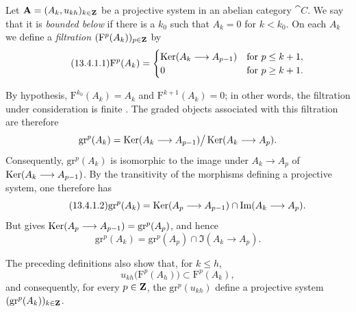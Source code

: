 \begin{env}[13.4.1]
\label{0.13.4.1}
Let
$\mathbf{A}=(A_k,u_{kh})_{k\in\mathbf{Z}}$ be a projective system in an
abelian category $\cat{C}$.
We say that it is \emph{bounded below} if there is a $k_0$ such that
$A_k=0$ for $k<k_0$.
On each $A_k$ we define a \emph{filtration}
$(\mathrm{F}^p(A_k))_{p\in\mathbf{Z}}$ by
\begin{equation}
\label{0.13.4.1.1}
\tag{13.4.1.1}
  \mathrm{F}^p(A_k)=
  \begin{cases}
    \operatorname{Ker}(A_k\longrightarrow A_{p-1}) & \text{for }p\leq k+1,\\
    0 & \text{for }p\geq k+1.
  \end{cases}
\end{equation}

By hypothesis,
$\mathrm{F}^{k_0}(A_k)=A_k$ and
$\mathrm{F}^{k+1}(A_k)=0$; in other words, the filtration under
consideration is finite .
The graded objects associated with this filtration are therefore
\[
  \mathrm{gr}^p(A_k)
  =
  \operatorname{Ker}(A_k\longrightarrow A_{p-1})
  \big/
  \operatorname{Ker}(A_k\longrightarrow A_p).
\]
Consequently, $\mathrm{gr}^p(A_k)$ is isomorphic to the image under
$A_k\longrightarrow A_p$ of
$\operatorname{Ker}(A_k\longrightarrow A_{p-1})$.
By the transitivity of the morphisms defining a projective system,
one therefore has
\begin{equation}
\label{0.13.4.1.2}
\tag{13.4.1.2}
  \mathrm{gr}^p(A_k)
  =
  \operatorname{Ker}(A_p\longrightarrow A_{p-1})
  \cap
  \operatorname{Im}(A_k\longrightarrow A_p).
\end{equation}
But  gives
$\operatorname{Ker}(A_p\longrightarrow A_{p-1})=\mathrm{gr}^p(A_p)$, and hence
\begin{equation}
\label{0.13.4.1.3}
\tag{13.4.1.3}
  \mathrm{gr}^p(A_k)
  =
  \mathrm{gr}^p(A_p)
  \cap
  \Im(A_k\longrightarrow A_p).
\end{equation}

The preceding definitions also show that, for $k\leq h$,
\[
  u_{kh}\bigl(\mathrm{F}^p(A_h)\bigr)
  \subset
  \mathrm{F}^p(A_k),
\]
and consequently, for every $p\in\mathbf{Z}$, the
$\mathrm{gr}^p(u_{kh})$ define a projective system
$(\mathrm{gr}^p(A_k))_{k\in\mathbf{Z}}$.
\end{env}

